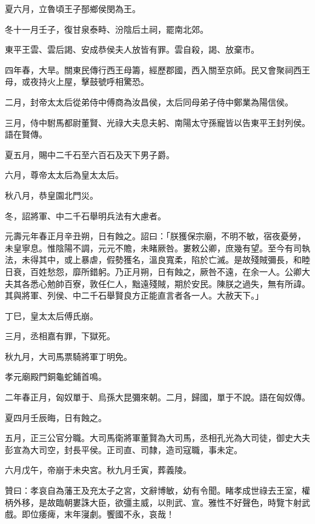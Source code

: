 \begin{pinyinscope}
夏六月，立魯頃王子郚鄉侯閔為王。

冬十一月壬子，復甘泉泰畤、汾陰后土祠，罷南北郊。

東平王雲、雲后謁、安成恭侯夫人放皆有罪。雲自殺，謁、放棄市。

四年春，大旱。關東民傳行西王母籌，經歷郡國，西入關至京師。民又會聚祠西王母，或夜持火上屋，擊鼓號呼相驚恐。

二月，封帝太太后從弟侍中傅商為汝昌侯，太后同母弟子侍中鄭業為陽信侯。

三月，侍中駙馬都尉董賢、光祿大夫息夫躬、南陽太守孫寵皆以告東平王封列侯。語在賢傳。

夏五月，賜中二千石至六百石及天下男子爵。

六月，尊帝太太后為皇太太后。

秋八月，恭皇園北門災。

冬，詔將軍、中二千石舉明兵法有大慮者。

元壽元年春正月辛丑朔，日有蝕之。詔曰：「朕獲保宗廟，不明不敏，宿夜憂勞，未皇寧息。惟陰陽不調，元元不贍，未睹厥咎。婁敕公卿，庶幾有望。至今有司執法，未得其中，或上暴虐，假勢獲名，溫良寬柔，陷於亡滅。是故殘賊彌長，和睦日衰，百姓愁怨，靡所錯躬。乃正月朔，日有蝕之，厥咎不遠，在余一人。公卿大夫其各悉心勉帥百寮，敦任仁人，黜遠殘賊，期於安民。陳朕之過失，無有所諱。其與將軍、列侯、中二千石舉賢良方正能直言者各一人。大赦天下。」

丁巳，皇太太后傅氏崩。

三月，丞相嘉有罪，下獄死。

秋九月，大司馬票騎將軍丁明免。

孝元廟殿門銅龜蛇鋪首鳴。

二年春正月，匈奴單于、烏孫大昆彌來朝。二月，歸國，單于不說。語在匈奴傳。

夏四月壬辰晦，日有蝕之。

五月，正三公官分職。大司馬衛將軍董賢為大司馬，丞相孔光為大司徒，御史大夫彭宣為大司空，封長平侯。正司直、司隸，造司寇職，事未定。

六月戊午，帝崩于未央宮。秋九月壬寅，葬義陵。

贊曰：孝哀自為藩王及充太子之宮，文辭博敏，幼有令聞。睹孝成世祿去王室，權柄外移，是故臨朝婁誅大臣，欲彊主威，以則武、宣。雅性不好聲色，時覽卞射武戲。即位痿痺，末年寖劇。饗國不永，哀哉！


\end{pinyinscope}